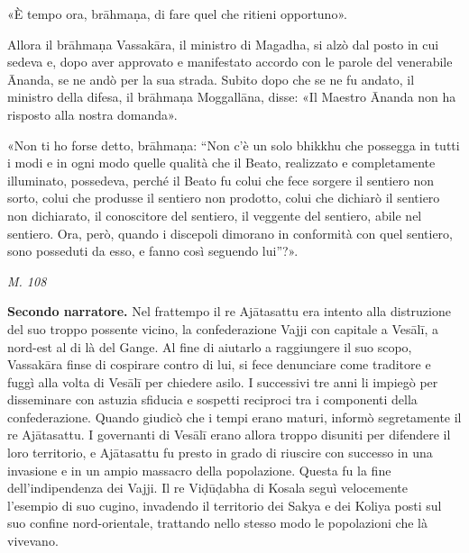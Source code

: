 «È tempo ora, brāhmaṇa, di fare quel che ritieni opportuno».


Allora il brāhmaṇa Vassakāra, il ministro di Magadha, si alzò dal posto
in cui sedeva e, dopo aver approvato e manifestato accordo con le parole
del venerabile Ānanda, se ne andò per la sua strada. Subito dopo che se
ne fu andato, il ministro della difesa, il brāhmaṇa Moggallāna, disse:
«Il Maestro Ānanda non ha risposto alla nostra domanda».


«Non ti ho forse detto, brāhmaṇa: “Non c’è un solo bhikkhu che possegga
in tutti i modi e in ogni modo quelle qualità che il Beato, realizzato e
completamente illuminato, possedeva, perché il Beato fu colui che fece
sorgere il sentiero non sorto, colui che produsse il sentiero non
prodotto, colui che dichiarò il sentiero non dichiarato, il conoscitore
del sentiero, il veggente del sentiero, abile nel sentiero. Ora, però,
quando i discepoli dimorano in conformità con quel sentiero, sono
posseduti da esso, e fanno così seguendo lui”?».


\emph{M. 108}


\textbf{Secondo narratore.} Nel frattempo il re Ajātasattu era intento alla
distruzione del suo troppo possente vicino, la confederazione Vajji con
capitale a Vesālī, a nord-est al di là del Gange. Al fine di aiutarlo a
raggiungere il suo scopo, Vassakāra finse di cospirare contro di lui, si
fece denunciare come traditore e fuggì alla volta di Vesālī per chiedere
asilo. I successivi tre anni li impiegò per disseminare con astuzia
sfiducia e sospetti reciproci tra i componenti della confederazione.
Quando giudicò che i tempi erano maturi, informò segretamente il re
Ajātasattu. I governanti di Vesālī erano allora troppo disuniti per
difendere il loro territorio, e Ajātasattu fu presto in grado di
riuscire con successo in una invasione e in un ampio massacro della
popolazione. Questa fu la fine dell’indipendenza dei Vajji. Il re
Viḍūḍabha di Kosala seguì velocemente l’esempio di suo cugino, invadendo
il territorio dei Sakya e dei Koliya posti sul suo confine
nord-orientale, trattando nello stesso modo le popolazioni che là
vivevano.


